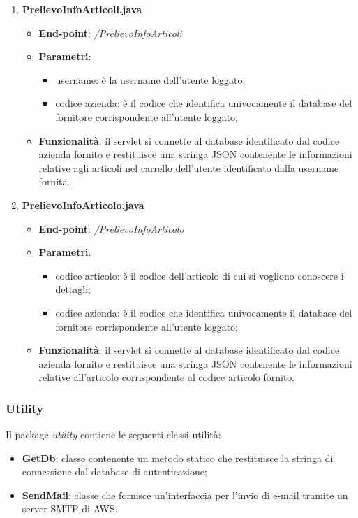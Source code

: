 \documentclass[12pt, a4paper, titlepage]{report}
\begin{document}
\begin{enumerate}
		\item \textbf{PrelievoInfoArticoli.java}
		\begin{itemize}
			\item \textbf{End-point}: \textit{/PrelievoInfoArticoli}
			\item \textbf{Parametri}:
			\begin{itemize}
				\item username: è la username dell'utente loggato;
				\item codice azienda: è il codice che identifica univocamente il database del fornitore corrispondente all'utente loggato;
			\end{itemize}
			\item \textbf{Funzionalità}: il servlet si connette al database identificato dal codice azienda fornito e restituisce una stringa JSON contenente le informazioni relative agli articoli nel carrello dell'utente identificato dalla username fornita.
		\end{itemize}
	
		\item \textbf{PrelievoInfoArticolo.java}
		\begin{itemize}
			\item \textbf{End-point}: \textit{/PrelievoInfoArticolo}
			\item \textbf{Parametri}:
			\begin{itemize}
				\item codice articolo: è il codice dell'articolo di cui si vogliono conoscere i dettagli;
				\item codice azienda: è il codice che identifica univocamente il database del fornitore corrispondente all'utente loggato;
			\end{itemize}
			\item \textbf{Funzionalità}: il servlet si connette al database identificato dal codice azienda fornito e restituisce una stringa JSON contenente le informazioni relative all'articolo corrispondente al codice articolo fornito.
		\end{itemize}
	\end{enumerate}
	
	\subsubsection{Utility}
	Il package \textit{utility} contiene le seguenti classi utilità:
	\begin{itemize}
		\item \textbf{GetDb}: classe contenente un metodo statico che restituisce la stringa di connessione dal database di autenticazione;
		\item \textbf{SendMail}: classe che fornisce un'interfaccia per l'invio di e-mail tramite un server SMTP di AWS.
	\end{itemize}
	
\end{document}

